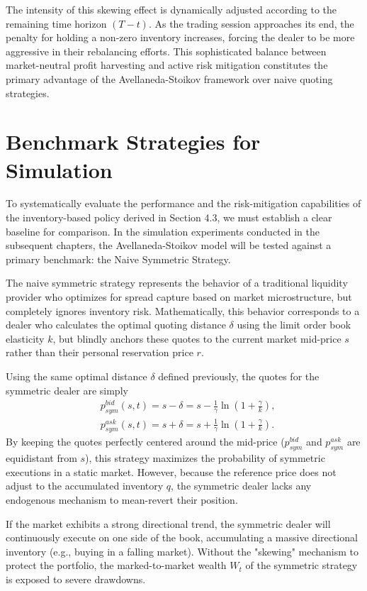 \documentclass[a4paper,10pt,titlepage,oneside,openany]{book}
\theoremstyle{plain}\newtheorem{theorem}{Theorem}[chapter]
\theoremstyle{definition}\newtheorem{definition}{Definition}[chapter]
\theoremstyle{remark}\newtheorem{remark}{Remark}[chapter]
\begin{document}
The intensity of this skewing effect is dynamically adjusted according to the remaining time horizon $(T-t)$. As the trading session approaches its end, the penalty for holding a non-zero inventory increases, forcing the dealer to be more aggressive in their rebalancing efforts. This sophisticated balance between market-neutral profit harvesting and active risk mitigation constitutes the primary advantage of the Avellaneda-Stoikov framework over naive quoting strategies.

\section{Benchmark Strategies for Simulation}

To systematically evaluate the performance and the risk-mitigation capabilities of the inventory-based policy derived in Section 4.3, we must establish a clear baseline for comparison. In the simulation experiments conducted in the subsequent chapters, the Avellaneda-Stoikov model will be tested against a primary benchmark: the Naive Symmetric Strategy.

The naive symmetric strategy represents the behavior of a traditional liquidity provider who optimizes for spread capture based on market microstructure, but completely ignores inventory risk. Mathematically, this behavior corresponds to a dealer who calculates the optimal quoting distance $\delta$ using the limit order book elasticity $k$, but blindly anchors these quotes to the current market mid-price $s$ rather than their personal reservation price $r$.

Using the same optimal distance $\delta$ defined previously, the quotes for the symmetric dealer are simply
\begin{align*}
    &p^{bid}_{sym}(s,t) = s - \delta = s - \frac{1}{\gamma} \ln \left( 1 + \frac{\gamma}{k} \right),\\
    &p^{ask}_{sym}(s,t) = s + \delta = s + \frac{1}{\gamma} \ln \left( 1 + \frac{\gamma}{k} \right).
\end{align*}
By keeping the quotes perfectly centered around the mid-price ($p^{bid}_{sym}$ and $p^{ask}_{sym}$ are equidistant from $s$), this strategy maximizes the probability of symmetric executions in a static market. However, because the reference price does not adjust to the accumulated inventory $q$, the symmetric dealer lacks any endogenous mechanism to mean-revert their position. 

If the market exhibits a strong directional trend, the symmetric dealer will continuously execute on one side of the book, accumulating a massive directional inventory (e.g., buying in a falling market). Without the "skewing" mechanism to protect the portfolio, the marked-to-market wealth $W_t$ of the symmetric strategy is exposed to severe drawdowns. 
\end{document}
